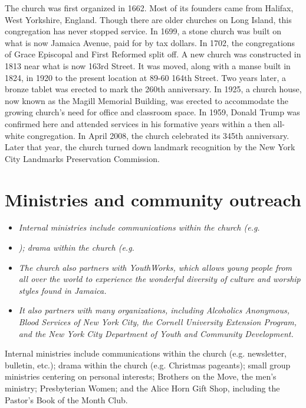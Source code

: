 The church was first organized in 1662. Most of its founders came from
Halifax, West Yorkshire, England. Though there are older churches on
Long Island, this congregation has never stopped service. In 1699, a
stone church was built on what is now Jamaica Avenue, paid for by tax
dollars. In 1702, the congregations of Grace Episcopal and First
Reformed split off. A new church was constructed in 1813 near what is
now 163rd Street. It was moved, along with a manse built in 1824, in
1920 to the present location at 89-60 164th Street. Two years later, a
bronze tablet was erected to mark the 260th anniversary. In 1925, a
church house, now known as the Magill Memorial Building, was erected to
accommodate the growing church's need for office and classroom space. In
1959, Donald Trump was confirmed here and attended services in his
formative years within a then all-white congregation. In April 2008, the
church celebrated its 345th anniversary. Later that year, the church
turned down landmark recognition by the New York City Landmarks
Preservation Commission.

\section{Ministries and community
outreach}\label{ministries-and-community-outreach}

\begin{itemize}
\item
  \emph{Internal ministries include communications within the church
  (e.g.}
\item
  \emph{); drama within the church (e.g.}
\item
  \emph{The church also partners with YouthWorks, which allows young
  people from all over the world to experience the wonderful diversity
  of culture and worship styles found in Jamaica.}
\item
  \emph{It also partners with many organizations, including Alcoholics
  Anonymous, Blood Services of New York City, the Cornell University
  Extension Program, and the New York City Department of Youth and
  Community Development.}
\end{itemize}

Internal ministries include communications within the church (e.g.
newsletter, bulletin, etc.); drama within the church (e.g. Christmas
pageants); small group ministries centering on personal interests;
Brothers on the Move, the men's ministry; Presbyterian Women; and the
Alice Horn Gift Shop, including the Pastor's Book of the Month Club.

